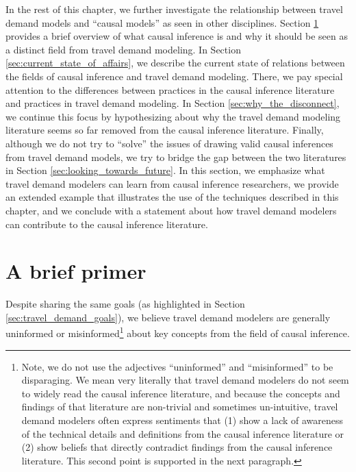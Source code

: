 In the rest of this chapter, we further investigate the relationship between travel demand models and ``causal models'' as seen in other disciplines. Section \ref{sec:brief_primer} provides a brief overview of what causal inference is and why it should be seen as a distinct field from travel demand modeling. In Section \ref{sec:current_state_of_affairs}, we describe the current state of relations between the fields of causal inference and travel demand modeling. There, we pay special attention to the differences between practices in the causal inference literature and practices in travel demand modeling. In Section \ref{sec:why_the_disconnect}, we continue this focus by hypothesizing about why the travel demand modeling literature seems so far removed from the causal inference literature. Finally, although we do not try to ``solve'' the issues of drawing valid causal inferences from travel demand models, we try to bridge the gap between the two literatures in Section \ref{sec:looking_towards_future}. In this section, we emphasize what travel demand modelers can learn from causal inference researchers, we provide an extended example that illustrates the use of the techniques described in this chapter, and we conclude with a statement about how travel demand modelers can contribute to the causal inference literature.

\section{A brief primer}
\label{sec:brief_primer}
Despite sharing the same goals (as highlighted in Section \ref{sec:travel_demand_goals}), we believe travel demand modelers are generally uninformed or misinformed\footnote{Note, we do not use the adjectives ``uninformed'' and ``misinformed'' to be disparaging. We mean very literally that travel demand modelers do not seem to widely read the causal inference literature, and because the concepts and findings of that literature are non-trivial and sometimes un-intuitive, travel demand modelers often express sentiments that (1) show a lack of awareness of the technical details and definitions from the causal inference literature or (2) show beliefs that directly contradict findings from the causal inference literature. This second point is supported in the next paragraph.} about key concepts from the field of causal inference.

